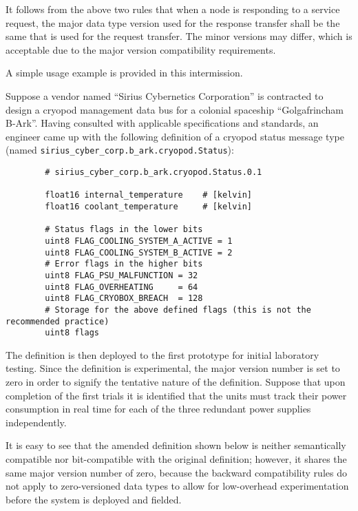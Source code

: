 It follows from the above two rules that when a node is responding to a service request,
the major data type version used for the response transfer shall be the same that is used for the request transfer.
The minor versions may differ, which is acceptable due to the major version compatibility requirements.

\begin{remark}[breakable]
    A simple usage example is provided in this intermission.

    Suppose a vendor named ``Sirius Cybernetics Corporation'' is contracted to design a
    cryopod management data bus for a colonial spaceship ``Golgafrincham B-Ark''.
    Having consulted with applicable specifications and standards, an engineer came up with the following
    definition of a cryopod status message type (named \verb|sirius_cyber_corp.b_ark.cryopod.Status|):

    \begin{verbatim}
        # sirius_cyber_corp.b_ark.cryopod.Status.0.1

        float16 internal_temperature    # [kelvin]
        float16 coolant_temperature     # [kelvin]

        # Status flags in the lower bits
        uint8 FLAG_COOLING_SYSTEM_A_ACTIVE = 1
        uint8 FLAG_COOLING_SYSTEM_B_ACTIVE = 2
        # Error flags in the higher bits
        uint8 FLAG_PSU_MALFUNCTION = 32
        uint8 FLAG_OVERHEATING     = 64
        uint8 FLAG_CRYOBOX_BREACH  = 128
        # Storage for the above defined flags (this is not the recommended practice)
        uint8 flags
    \end{verbatim}

    The definition is then deployed to the first prototype for initial laboratory testing.
    Since the definition is experimental, the major version number is set to zero in order to signify the
    tentative nature of the definition.
    Suppose that upon completion of the first trials it is identified that the units must track their power consumption
    in real time for each of the three redundant power supplies independently.

    It is easy to see that the amended definition shown below is neither semantically compatible nor bit-compatible
    with the original definition; however, it shares the same major version number of zero, because the backward
    compatibility rules do not apply to zero-versioned data types to allow for low-overhead experimentation
    before the system is deployed and fielded.


\end{remark}
